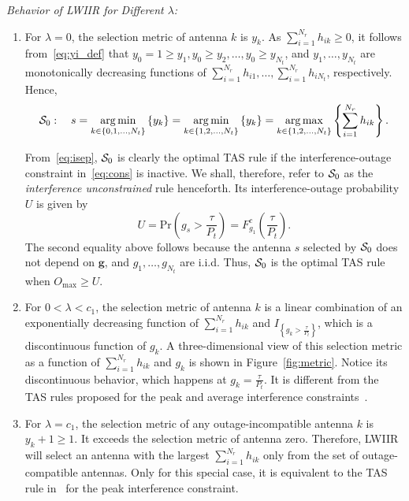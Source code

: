 \documentclass[12pt,draftcls,peerreview,onecolumn]{IEEEtran}
\newcommand{\brac}[1]{\left({#1}\right)}
\newcommand{\cbrac}[1]{\left\{{#1}\right\}}
\newcommand{\indic}[1]{I_{\cbrac{#1}}}
\newcommand{\ie}{{i.e.}}
\newcommand{\prob}[1]{\text{Pr}\brac{#1}}
\DeclareMathOperator*{\argmin}{arg\,min}
\DeclareMathOperator*{\argmax}{arg\,max}
\newcommand{\nx}{{0}}
\newcommand{\lam}{\lambda}
\newcommand{\Nt}{{N_t}}
\newcommand{\Nr}{{N_r}}
\newcommand{\Pt}{{P_t}}
\newcommand{\such}{h}
\newcommand{\puch}{g}
\newcommand{\hk}[1]{{\such_{#1}}}
\newcommand{\gk}[1]{{\puch_{#1}}}
\newcommand{\g}{\mathbf{\puch}}
\newcommand{\outmax}{O_{\text{max}}}
\newcommand{\itau}{\tau}
\newcommand{\cone}{c_{1}}
\newcommand{\taubypt}{\frac{\itau}{\Pt}}
\newcommand{\gkgrtaubypt}[1]{{\gk{#1}}>\taubypt}
\newcommand{\yk}[1]{y_{#1}}
\newcommand{\un}{U}
\newcommand{\allopts}{\left\{\nx,1,\ldots,\Nt\right\}}
\newcommand{\antopts}{\left\{1,2,\ldots,\Nt\right\}}
\newcommand{\caluncons}{{\cal S_{\text{0}}}}
\newcommand{\sumnr}{\sum_{i=1}^{\Nr}}
\begin{document}
{\em Behavior of LWIIR for Different $\lam$:}
\begin{enumerate}
\item For $\lam=0$, the selection metric of antenna $k$ is $\yk{k}$. As $\sumnr\hk{ik}\geq 0$, it follows from~\eqref{eq:yi_def} that $\yk{0}=1\geq\yk{1},\yk{0}\geq\yk{2},\ldots,\yk{0}\geq\yk{\Nt}$, and   $\yk{1},\ldots,\yk{\Nt}$ are monotonically decreasing functions of $\sumnr\hk{i1},\ldots,\sumnr\hk{i\Nt}$, respectively. Hence, 
\begin{equation}
\caluncons:\quad s=\argmin\limits_{k\in\allopts} \left\{ \yk{k} \right\} = \argmin\limits_{k\in\antopts} \left\{ \yk{k} \right\} = \argmax\limits_{k\in\antopts} \left\{\sumnr \hk{ik} \right\}.
\label{eq:uncons_simple}
\end{equation}

From~\eqref{eq:isep}, $\caluncons$ is clearly the optimal TAS rule if the interference-outage constraint in~\eqref{eq:cons} is inactive. We shall, therefore, refer to $\caluncons$ as the {\em interference unconstrained} rule henceforth. Its interference-outage probability $\un$ is given by
%
\begin{equation}
\un= \prob{\gk{s}>\taubypt}= F^c_{\gk{1}}\!\!\left({\taubypt}\right).
\label{eq:uncomsoutage}
\end{equation}
%
The second equality above follows because the antenna $s$ selected by $\caluncons$ does not depend on $\g$, and $\gk{1},\ldots,\gk{\Nt}$ are i.i.d. Thus, $\caluncons$ is the optimal TAS rule when $\outmax \geq \un$. 

\item For $0<\lam<\cone$, the selection metric of antenna $k$ is a linear combination of  an exponentially decreasing function of $\sumnr\hk{ik}$ and $\indic{\gkgrtaubypt{k}}$, which is a discontinuous function of $\gk{k}$. A three-dimensional view of this selection metric as a function of $\sumnr\hk{ik}$ and $\gk{k}$ is shown in Figure~\ref{fig:metric}. Notice its discontinuous behavior, which happens at $\gk{k}=\taubypt$. It is different from the TAS rules proposed for the peak and average interference constraints~\cite{Fakhan_2014_TSP,Wang_2010_TWC,Wang_2011_TCom,Sarvendranath_2013_TCOM,Sarvendranath_2014_TCOM}.

\item For $\lam=\cone$, the selection metric of any outage-incompatible antenna $k$ is  $\yk{k}+1\geq 1$. It exceeds the selection metric of antenna zero. Therefore, LWIIR will select an antenna with the largest $\sumnr\hk{ik}$ only from the set of outage-compatible antennas. Only for this special case, it is equivalent to the TAS rule in~\cite{Hanif_2015_globecom}  for the peak interference constraint.


\end{enumerate}
\end{document}
